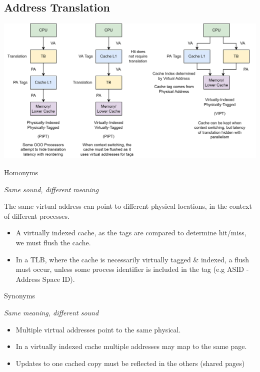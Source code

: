 \subsection{Address Translation}
\begin{center}
    \includegraphics[width=\textwidth]{caches/images/address_translation.drawio.png}
\end{center}
\begin{tcbraster}[raster columns=2,raster equal height]
    \begin{definitionbox}{Homonyms}
        \centerline{\textit{Same sound, different meaning}}
        The same virtual address can point to different physical locations, in the context of different processes.
        \begin{itemize}
            \item A virtually indexed cache, as the tags are compared to determine hit/miss, we must flush the cache.
            \item In a TLB, where the cache is necessarily virtually tagged \& indexed, a flush must occur, unless some process identifier is included in the tag (e.g ASID - Address Space ID).
        \end{itemize}
    \end{definitionbox}
    \begin{definitionbox}{Synonyms}
        \centerline{\textit{Same meaning, different sound}}
        \begin{itemize}
            \item Multiple virtual addresses point to the same physical.
            \item In a virtually indexed cache multiple addresses may map to the same page.
            \item Updates to one cached copy must be reflected in the others (shared pages)
        \end{itemize}
    \end{definitionbox}
\end{tcbraster}

